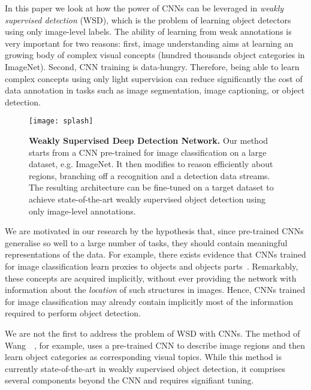 \documentclass[10pt,twocolumn,letterpaper]{article}
\begin{document}
In this paper we look at how the power of CNNs can be leveraged in  \emph{weakly supervised detection} (WSD), which is the problem of learning object detectors using only image-level labels. The ability of learning from weak annotations is very important for two reasons: first, image understanding aims at learning an growing body of complex visual concepts (\eg hundred thousands object categories in ImageNet). Second, CNN training is data-hungry. Therefore, being able to learn complex concepts using only light supervision can reduce significantly the cost of data annotation in tasks such as image segmentation, image captioning, or object detection.

\begin{figure}
\begin{center}
\texttt{[image: splash]} 
\end{center}
\caption{{\bf Weakly Supervised Deep Detection Network.} Our method starts from a CNN pre-trained for image classification on a large dataset, e.g. ImageNet. It then modifies to reason efficiently about regions, branching off a recognition and a detection data streams. The resulting architecture can be fine-tuned on a target dataset to achieve state-of-the-art weakly supervised object detection using only image-level annotations.}
\label{f:splash}
\end{figure}

We are motivated in our research by the hypothesis that, since pre-trained CNNs generalise so well to a large number of tasks, they should contain meaningful representations of the data. For example, there exists evidence that CNNs trained for image classification learn proxies to objects and objects parts~\cite{Zhou15}. Remarkably, these concepts are acquired implicitly, without ever providing the network with information about the \emph{location} of such structures in images. Hence, CNNs trained for image classification may already contain implicitly most of the information required to perform object detection.

We are not the first to address the problem of WSD with CNNs. The method of Wang~\etal~\cite{Wang14a}, for example, uses a pre-trained CNN to describe image regions and then learn object categories as corresponding visual topics. While this method is currently state-of-the-art in weakly supervised object detection, it comprises several components beyond the CNN and requires signifiant tuning. 
\end{document}

